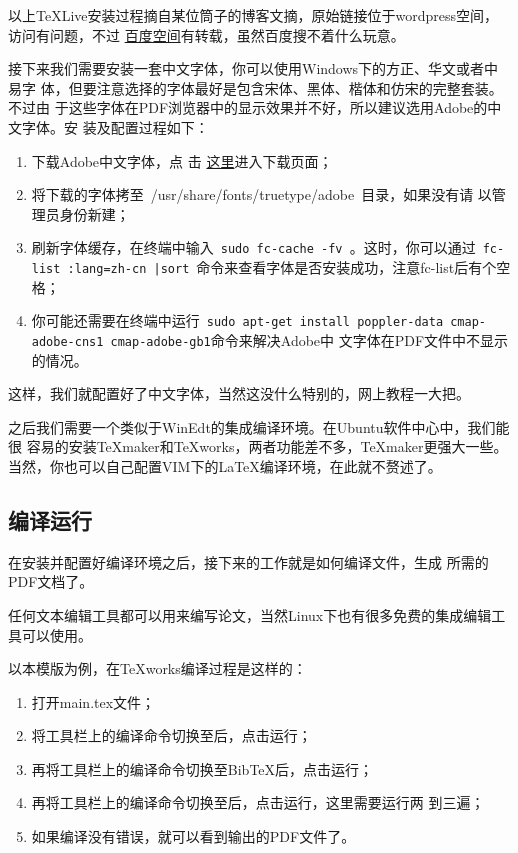 以上\TeX{}Live安装过程摘自某位筒子的博客文摘，原始链接位于wordpress空间，
访问有问题，不过
\href{http://hi.baidu.com/skubuntu/blog/item/89e8de2f73a465e08a1399a3.html}{
  百度空间}有转载，虽然百度搜不着什么玩意。

接下来我们需要安装一套中文字体，你可以使用Windows下的方正、华文或者中易字
体，但要注意选择的字体最好是包含宋体、黑体、楷体和仿宋的完整套装。不过由
于这些字体在PDF浏览器中的显示效果并不好，所以建议选用Adobe的中文字体。安
装及配置过程如下：

\begin{enumerate}
\item 下载Adobe中文字体，点
  击
  \href{http://forum.ubuntu.org.cn/viewtopic.php?f=35&t=180987&start=0}{
    这里}进入下载页面；
\item 将下载的字体拷至~{/usr/share/fonts/truetype/adobe}~目录，如果没有请
  以管理员身份新建；
\item 刷新字体缓存，在终端中输入~\texttt{\footnotesize sudo fc-cache -fv }。这时，你可以通过~\texttt{\footnotesize fc-list :lang=zh-cn |sort}~命令来查看字体是否安装成功，注意fc-list后有个空格；
\item 你可能还需要在终端中运行~\texttt{\footnotesize sudo apt-get
    install poppler-data cmap-adobe-cns1 cmap-adobe-gb1}命令来解决Adobe中
  文字体在PDF文件中不显示的情况。
\end{enumerate}

这样，我们就配置好了中文字体，当然这没什么特别的，网上教程一大把。

之后我们需要一个类似于WinEdt的集成编译环境。在Ubuntu软件中心中，我们能很
容易的安装\TeX{}maker和\TeX{}works，两者功能差不多，\TeX{}maker更强大一些。
当然，你也可以自己配置VIM下的\LaTeX{}编译环境，在此就不赘述了。

\subsection{编译运行}

在安装并配置好编译环境之后，接下来的工作就是如何编译\XeLaTeX{}文件，生成
所需的PDF文档了。

任何文本编辑工具都可以用来编写论文，当然Linux下也有很多免费的集成编辑工具可以使用。

以本模版为例，在\TeX{}works编译过程是这样的：
\begin{enumerate}
\item 打开main.tex文件；
\item 将工具栏上的编译命令切换至\XeLaTeX{}后，点击运行；
\item 再将工具栏上的编译命令切换至Bib\TeX{}后，点击运行；
\item 再将工具栏上的编译命令切换至\XeLaTeX{}后，点击运行，这里需要运行两
  到三遍；
\item 如果编译没有错误，就可以看到输出的PDF文件了。
\end{enumerate}

